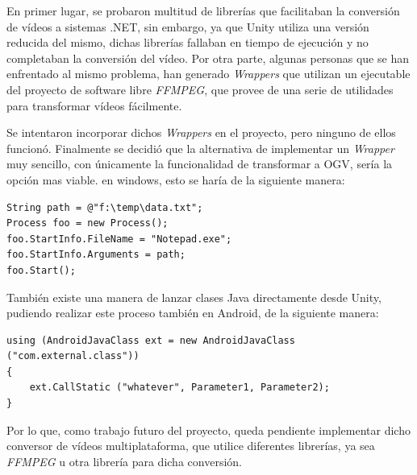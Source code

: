 En primer lugar, se probaron multitud de librerías que facilitaban la conversión de vídeos a sistemas .NET, sin embargo, ya que Unity utiliza una versión reducida del mismo, dichas librerías fallaban en tiempo de ejecución y no completaban la conversión del vídeo. Por otra parte, algunas personas que se han enfrentado al mismo problema, han generado \textit{Wrappers} que utilizan un ejecutable del proyecto de software libre \textit{FFMPEG}, que provee de una serie de utilidades para transformar vídeos fácilmente.

Se intentaron incorporar dichos \textit{Wrappers} en el proyecto, pero ninguno de ellos funcionó. Finalmente se decidió que la alternativa de implementar un \textit{Wrapper} muy sencillo, con únicamente la funcionalidad de transformar a OGV, sería la opción mas viable. en windows, esto se haría de la siguiente manera:

\begin{lstlisting}
String path = @"f:\temp\data.txt";
Process foo = new Process();
foo.StartInfo.FileName = "Notepad.exe";
foo.StartInfo.Arguments = path;
foo.Start();
\end{lstlisting}

También existe una manera de lanzar clases Java directamente desde Unity, pudiendo realizar este proceso también en Android, de la siguiente manera:

\begin{lstlisting}
using (AndroidJavaClass ext = new AndroidJavaClass ("com.external.class")) 
{
	ext.CallStatic ("whatever", Parameter1, Parameter2);
}
\end{lstlisting}

Por lo que, como trabajo futuro del proyecto, queda pendiente implementar dicho conversor de vídeos multiplataforma, que utilice diferentes librerías, ya sea \textit{FFMPEG} u otra librería para dicha conversión.


